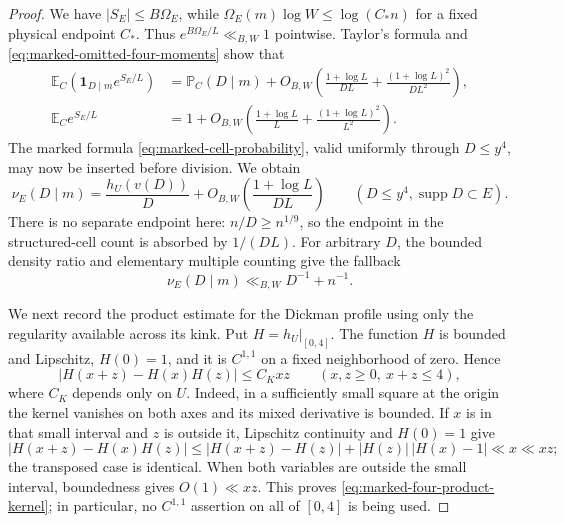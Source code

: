 \documentclass[11pt]{article}
\numberwithin{equation}{section}
\theoremstyle{definition}
\theoremstyle{remark}
\newcommand{\1}{\mathbf 1}
\begin{document}
\begin{proof}
We have \(|S_E|\le B\Omega_E\), while
\(\Omega_E(m)\log W\le\log(C_*n)\) for a fixed physical endpoint
\(C_*\).  Thus \(e^{B\Omega_E/L}\ll_{B,W}1\) pointwise.  Taylor's
formula and \eqref{eq:marked-omitted-four-moments} show that
\begin{align*}
 \mathbb E_C(\1_{D\mid m}e^{S_E/L})
 &=\mathbb P_C(D\mid m)
   +O_{B,W}\!\left(\frac{1+\log L}{DL}
              +\frac{(1+\log L)^2}{DL^2}\right),\\
 \mathbb E_Ce^{S_E/L}
 &=1+O_{B,W}\!\left(\frac{1+\log L}{L}
              +\frac{(1+\log L)^2}{L^2}\right).
\end{align*}
The marked formula \eqref{eq:marked-cell-probability}, valid uniformly
through \(D\le y^4\), may now be inserted before division.  We obtain
\begin{equation}
 \nu_E(D\mid m)=\frac{h_U(v(D))}{D}
       +O_{B,W}\!\left(\frac{1+\log L}{DL}\right)
 \qquad(D\le y^4, \operatorname{supp}D\subset E).
 \label{eq:marked-omitted-four-transfer}
\end{equation}
There is no separate endpoint here: \(n/D\ge n^{1/9}\), so the endpoint
in the structured-cell count is absorbed by \(1/(DL)\).  For arbitrary
\(D\), the bounded density ratio and elementary multiple counting give
the fallback
\begin{equation}
                         \nu_E(D\mid m)\ll_{B,W}D^{-1}+n^{-1}.
 \label{eq:marked-omitted-four-fallback}
\end{equation}

We next record the product estimate for the Dickman profile using only
the regularity available across its kink.  Put \(H=h_U|_{[0,4]}\).
The function \(H\) is bounded and Lipschitz, \(H(0)=1\), and it is
\(C^{1,1}\) on a fixed neighborhood of zero.  Hence
\begin{equation}
 |H(x+z)-H(x)H(z)|\le C_Kxz
 \qquad(x,z\ge0,\ x+z\le4),
 \label{eq:marked-four-product-kernel}
\end{equation}
where \(C_K\) depends only on \(U\).  Indeed, in a sufficiently small
square at the origin the kernel vanishes on both axes and its mixed
derivative is bounded.  If \(x\) is in that small interval and \(z\)
is outside it, Lipschitz continuity and \(H(0)=1\) give
\[
 |H(x+z)-H(x)H(z)|
 \le |H(x+z)-H(z)|+|H(z)|\,|H(x)-1|\ll x\ll xz;
\]
the transposed case is identical.  When both variables are outside the
small interval, boundedness gives \(O(1)\ll xz\).  This proves
\eqref{eq:marked-four-product-kernel}; in particular, no
\(C^{1,1}\) assertion on all of \([0,4]\) is being used.


\end{proof}
\end{document}
